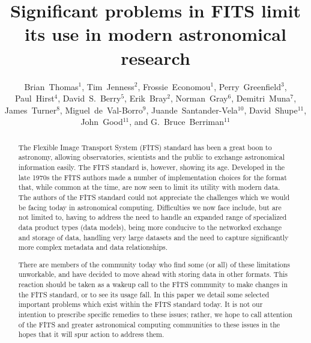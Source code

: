 \documentclass[11pt,twoside]{article}
\begin{document}
\title{Significant problems in FITS limit its use in modern astronomical research}
\author{Brian~Thomas$^1$, Tim~Jenness$^2$, Frossie~Economou$^1$, Perry~Greenfield$^3$,
Paul~Hirst$^4$, 
David~S.~Berry$^5$, Erik~Bray$^2$,
Norman~Gray$^6$, Demitri~Muna$^7$, James~Turner$^8$,
Miguel~de~Val-Borro$^9$, Juande~Santander-Vela$^{10}$,
David~Shupe$^{11}$, John~Good$^{11}$, and G.~Bruce~Berriman$^{11}$
}

\begin{abstract}
  The Flexible Image Transport System (FITS) standard has been a great
  boon to astronomy, allowing observatories, scientists and the public
  to exchange astronomical information easily. The FITS standard is,
  however, showing its age. Developed in the late 1970s the FITS
  authors made a number of implementation choices for the format that,
  while common at the time, are now seen to limit its utility with modern
  data. The authors of the FITS standard could not appreciate the
  challenges which we would be facing today in astronomical
  computing. Difficulties we now face include, but are not limited to,
  having to address the need to handle an expanded range of
  specialized data product types (data models), being more conducive
  to the networked exchange and storage of data, handling very large
  datasets and the need to capture significantly more complex metadata
  and data relationships.

  There are members of the community today who find some (or all) of
  these limitations unworkable, and have decided to move ahead with
  storing data in other formats. This reaction should be taken as a
  wakeup call to the FITS community to make changes in the FITS
  standard, or to see its usage fall. In this paper we detail some
  selected important problems which exist within the FITS standard
  today.  It is not our intention to prescribe specific remedies to
  these issues; rather, we hope to call attention of the FITS and
  greater astronomical computing communities to these issues in the
  hopes that it will spur action to address them.
\end{abstract}
\end{document}
